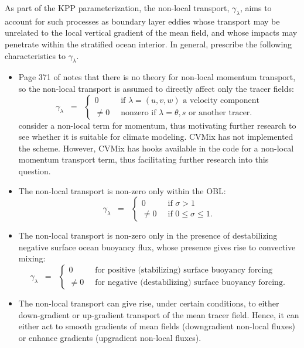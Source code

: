 As part of the KPP parameterization, the non-local transport,
$\gamma_{\lambda}$, aims to account for such processes as boundary
layer eddies whose transport may be unrelated to the local vertical
gradient of the mean field, and whose impacts may penetrate within the
stratified ocean interior. In general, \cite{LargeKPP} prescribe the
following characteristics to $\gamma_{\lambda}$.
\begin{itemize}

\item Page 371 of \citep{LargeKPP} notes that there is no theory for
  non-local momentum transport, so the non-local transport is assumed
  to directly affect only the tracer fields:
\begin{equation}
 \gamma_{\lambda} \; \; = \; \; 
\left\{
 \begin{array}{ll}
  0 \; \;  &\mbox{if $\lambda = (u,v,w)$ a velocity component}
 \\
  \ne 0 \; \; &\mbox{nonzero if $\lambda = \theta,s$ or another tracer.}
  \end{array}
 \right.
\end{equation}
\cite{Smyth_etal2002} consider a non-local term for momentum, thus
motivating further research to see whether it is suitable for climate
modeling.  CVMix has not implemented the \cite{Smyth_etal2002} scheme.
However, CVMix has hooks available in the code for a non-local
momentum transport term, thus facilitating further research into this
question.

  \item The non-local transport is non-zero only within the OBL:  
\begin{equation}
 \gamma_{\lambda} \; \; = \; \; 
  \left\{ 
  \begin{array}{ll}
   0 \; \; &\mbox{if $\sigma > 1$}
   \\ 
   \ne 0  \; \; &\mbox{if $0 \le \sigma \le 1$.}
  \end{array}
 \right.
\end{equation}

  \item The non-local transport is non-zero only in the presence of
    destabilizing negative surface ocean buoyancy flux, whose presence
    gives rise to convective mixing:
\begin{equation}
 \gamma_{\lambda} \; \; = \; \; 
  \left\{ 
  \begin{array}{ll}
   0 \; \; &\mbox{for positive (stabilizing) surface buoyancy forcing}
   \\ 
   \ne 0  \; \; &\mbox{for negative (destabilizing) surface buoyancy forcing.}
  \end{array}
 \right.
\end{equation}

  \item The non-local transport can give rise, under
    certain conditions, to either down-gradient or up-gradient
    transport of the mean tracer field. Hence, it can either act to
    smooth gradients of mean fields (downgradient non-local fluxes) or
    enhance gradients (upgradient non-local fluxes).

\end{itemize}
